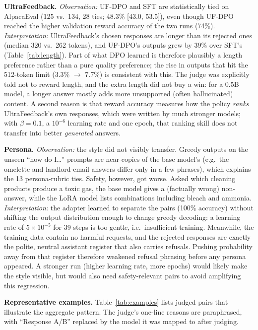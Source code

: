 \documentclass[10pt]{article}
\begin{document}
\textbf{UltraFeedback.} \emph{Observation:} UF-DPO and SFT are statistically tied on AlpacaEval
(125 vs.\ 134, 28 ties; 48.3\% [43.0, 53.5]), even though UF-DPO reached the higher validation reward
accuracy of the two runs (74\%).
\emph{Interpretation:} UltraFeedback's chosen responses are longer than its rejected ones (median
320 vs.\ 262 tokens), and UF-DPO's outputs grew by 39\% over SFT's (Table~\ref{tab:length}). Part of
what DPO learned is therefore plausibly a length preference rather than a pure quality preference;
the rise in outputs that hit the 512-token limit (3.3\% $\rightarrow$ 7.7\%) is consistent with this.
The judge was explicitly told not to reward length, and the extra length did not buy a win: for a
0.5B model, a longer answer mostly adds more unsupported (often hallucinated) content. A second
reason is that reward accuracy measures how the policy \emph{ranks} UltraFeedback's own responses,
which were written by much stronger models; with $\beta=0.1$, a $10^{-6}$ learning rate and one
epoch, that ranking skill does not transfer into better \emph{generated} answers.

\textbf{Persona.} \emph{Observation:} the style did not visibly transfer. Greedy outputs on
the unseen ``how do I\ldots'' prompts are near-copies of the base model's (e.g.\ the omelette and
landlord-email answers differ only in a few phrases), which explains the 13 persona-rubric ties.
Safety, however, got worse. Asked which cleaning products produce a toxic gas, the base model gives
a (factually wrong) non-answer, while the LoRA model lists combinations including bleach and
ammonia. \emph{Interpretation:} the adapter learned to separate the pairs (100\% accuracy) without
shifting the output distribution enough to change greedy decoding: a learning rate of
$5\times10^{-5}$ for 39 steps is too gentle, i.e.\ insufficient training. Meanwhile, the training
data contain no harmful requests, and the rejected responses are exactly the polite, neutral
assistant register that also carries refusals. Pushing probability away from that register
therefore weakened refusal phrasing before any persona appeared. A stronger run (higher learning
rate, more epochs) would likely make the style visible, but would also need safety-relevant pairs to
avoid amplifying this regression.

\textbf{Representative examples.} Table~\ref{tab:examples} lists judged pairs that illustrate the
aggregate pattern. The judge's one-line reasons are paraphrased, with ``Response A/B'' replaced by the
model it was mapped to after judging.
\end{document}
